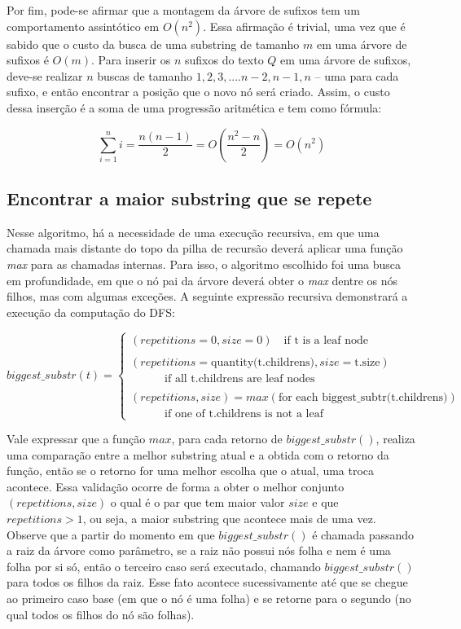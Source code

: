 Por fim, pode-se afirmar que a montagem da árvore de sufixos tem um comportamento
assintótico em $O(n^2)$.
Essa afirmação é trivial, uma vez que é sabido que o custo da busca de uma
substring de tamanho $m$ em uma árvore de sufixos é $O(m)$.
Para inserir os $n$ sufixos do texto $Q$ em uma árvore de sufixos, deve-se
realizar $n$ buscas de tamanho $1, 2, 3, .... n-2, n-1, n$ -- uma para cada
sufixo, e então encontrar a posição que o novo nó será criado.
Assim, o custo dessa inserção é a soma de uma progressão aritmética e tem como
fórmula: 

$$\sum_{i=1}^{n}i = \frac{n(n-1)}{2} = O(\frac{n^2-n}{2}) = O(n^2)$$


\subsection{Encontrar a maior substring que se repete}
Nesse algoritmo, há a necessidade de uma execução recursiva, em que uma chamada
mais distante do topo da pilha de recursão deverá aplicar uma função
\textit{max} para as chamadas internas.
Para isso, o algoritmo escolhido foi uma busca em profundidade, em que o nó
pai da árvore deverá obter o \textit{max} dentre os nós filhos, mas com algumas
exceções.
A seguinte expressão recursiva demonstrará a execução da computação do DFS:

\[ biggest\_substr(t) = 
    \begin{cases}
        (repetitions = 0, size = 0) \quad \text{if t is a leaf node} \\
        \\
        (repetitions = \text{quantity(t.childrens)}, size = \text{t.size}) \\
        \quad \quad \quad \text{if all t.childrens are leaf nodes}\\
        \\
        (repetitions, size) = max(\text{for each biggest\_subtr(t.childrens)}) \\
         \quad \quad \quad \text{if one of t.childrens is not a leaf}
    \end{cases}
\]

Vale expressar que a função $max$, para cada retorno de $biggest\_substr()$,
realiza uma comparação entre a melhor substring atual e a obtida com o
retorno da função, então se o retorno for uma melhor escolha que o atual,
uma troca acontece.
Essa validação ocorre de forma a obter o melhor conjunto
$(repetitions, size)$ o qual é o par que tem maior valor $size$ e que
$repetitions > 1$, ou seja, a maior substring que acontece mais de uma vez.
Observe que a partir do momento em que $biggest\_substr()$ é chamada passando
a raiz da árvore como parâmetro, se a raiz não possui nós folha e nem é uma folha
por si só, então o terceiro caso será executado, chamando $biggest\_substr()$
para todos os filhos da raiz.
Esse fato acontece sucessivamente até que se chegue ao primeiro caso base (em
que o nó é uma folha) e se retorne para o segundo (no qual todos os filhos do
nó são folhas).

